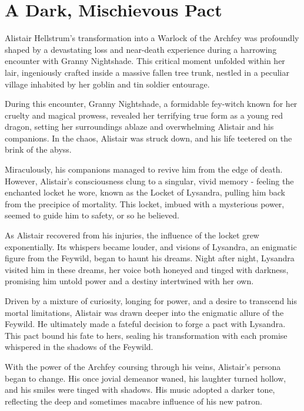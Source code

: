 \documentclass[letterpaper,openany,oneside,twocolumn]{book}
\begin{document}
\chapter*{A Dark, Mischievous Pact}
\noindent Alistair Hellstrum's transformation into a Warlock of the Archfey was profoundly shaped by a devastating loss and near-death experience during a harrowing encounter with Granny Nightshade. This critical moment unfolded within her lair, ingeniously crafted inside a massive fallen tree trunk, nestled in a peculiar village inhabited by her goblin and tin soldier entourage.

During this encounter, Granny Nightshade, a formidable fey-witch known for her cruelty and magical prowess, revealed her terrifying true form as a young red dragon, setting her surroundings ablaze and overwhelming Alistair and his companions. In the chaos, Alistair was struck down, and his life teetered on the brink of the abyss.

Miraculously, his companions managed to revive him from the edge of death. However, Alistair's consciousness clung to a singular, vivid memory - feeling the enchanted locket he wore, known as the Locket of Lysandra, pulling him back from the precipice of mortality. This locket, imbued with a mysterious power, seemed to guide him to safety, or so he believed.

As Alistair recovered from his injuries, the influence of the locket grew exponentially. Its whispers became louder, and visions of Lysandra, an enigmatic figure from the Feywild, began to haunt his dreams. Night after night, Lysandra visited him in these dreams, her voice both honeyed and tinged with darkness, promising him untold power and a destiny intertwined with her own.

Driven by a mixture of curiosity, longing for power, and a desire to transcend his mortal limitations, Alistair was drawn deeper into the enigmatic allure of the Feywild. He ultimately made a fateful decision to forge a pact with Lysandra. This pact bound his fate to hers, sealing his transformation with each promise whispered in the shadows of the Feywild.

With the power of the Archfey coursing through his veins, Alistair's persona began to change. His once jovial demeanor waned, his laughter turned hollow, and his smiles were tinged with shadows. His music adopted a darker tone, reflecting the deep and sometimes macabre influence of his new patron.
\end{document}
